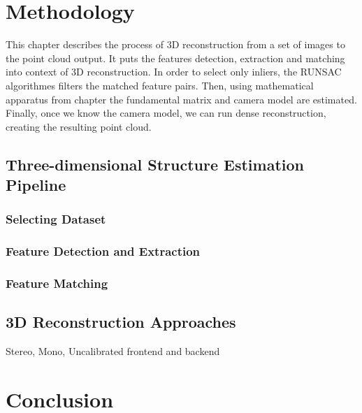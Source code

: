 \chapter{Methodology}
\label{chapter:methodology}
This chapter describes the process of 3D reconstruction from a set of images to the point cloud output. It puts the features detection, extraction and matching into context of 3D reconstruction. In order to select only inliers, the RUNSAC algorithmes filters the matched feature pairs. Then, using mathematical apparatus from chapter  the fundamental matrix and camera model are estimated. Finally, once we know the camera model, we can run dense reconstruction, creating the resulting point cloud.  
\section{Three-dimensional Structure Estimation Pipeline}
\subsection*{Selecting Dataset}
\subsection*{Feature Detection and Extraction}
\subsection*{Feature Matching}
\section{3D Reconstruction Approaches}
Stereo, Mono, Uncalibrated
frontend and backend

\chapter{Conclusion}
\label{chapter:conclusion}

